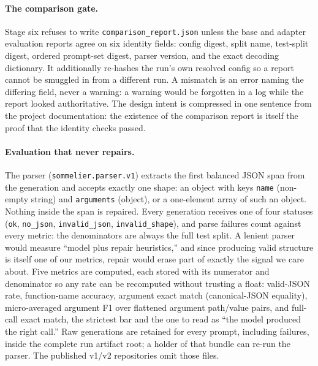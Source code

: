 \documentclass{article}
\begin{document}
\paragraph{The comparison gate.}
Stage six refuses to write \texttt{comparison\_report.json} unless the base and adapter evaluation reports agree on six identity fields: config digest, split name, test-split digest, ordered prompt-set digest, parser version, and the exact decoding dictionary. It additionally re-hashes the run's own resolved config so a report cannot be smuggled in from a different run. A mismatch is an error naming the differing field, never a warning: a warning would be forgotten in a log while the report looked authoritative. The design intent is compressed in one sentence from the project documentation: the existence of the comparison report is itself the proof that the identity checks passed.

\paragraph{Evaluation that never repairs.}
The parser (\texttt{sommelier.parser.v1}) extracts the first balanced JSON span from the generation and accepts exactly one shape: an object with keys \texttt{name} (non-empty string) and \texttt{arguments} (object), or a one-element array of such an object. Nothing inside the span is repaired. Every generation receives one of four statuses (\texttt{ok}, \texttt{no\_json}, \texttt{invalid\_json}, \texttt{invalid\_shape}), and parse failures count against every metric: the denominators are always the full test split. A lenient parser would measure ``model plus repair heuristics,'' and since producing valid structure is itself one of our metrics, repair would erase part of exactly the signal we care about. Five metrics are computed, each stored with its numerator and denominator so any rate can be recomputed without trusting a float: valid-JSON rate, function-name accuracy, argument exact match (canonical-JSON equality), micro-averaged argument F1 over flattened argument path/value pairs, and full-call exact match, the strictest bar and the one to read as ``the model produced the right call.'' Raw generations are retained for every prompt, including failures, inside the complete run artifact root; a holder of that bundle can re-run the parser. The published v1/v2 repositories omit those files.
\end{document}
